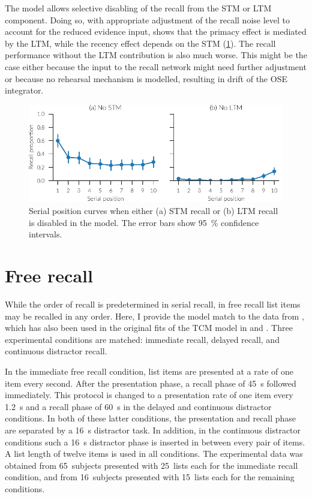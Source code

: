 The model allows selective disabling of the recall from the STM or LTM component.
Doing so, with appropriate adjustment of the recall noise level to account for the reduced evidence input, shows that the primacy effect is mediated by the LTM, while the recency effect depends on the STM (\cref{fig:results-no_xtm}).
The recall performance without the LTM contribution is also much worse.
This might be the case either because the input to the recall network might need further adjustment or because no rehearsal mechanism is modelled, resulting in drift of the OSE integrator.
\begin{figure}
    \centering
    \includegraphics{figures/results/no_xtm}
    \caption[Serial position curves with disabled STM/LTM.]{Serial position curves when either (a) STM recall or (b) LTM recall is disabled in the model. The error bars show \SI{95}{\percent} confidence intervals.}\label{fig:results-no_xtm}
\end{figure}


\section{Free recall}
While the order of recall is predetermined in serial recall, in free recall list items may be recalled in any order.
Here, I provide the model match to the data from \textcite{Howard1999}, which has also been used in the original fits of the TCM model in \textcite{Howard2002} and \textcite{Sederberg2008}.
Three experimental conditions are matched: immediate recall, delayed recall, and continuous distractor recall.

In the immediate free recall condition, list items are presented at a rate of one item every second.
After the presentation phase, a recall phase of \SI{45}{\second} followed immediately.
This protocol is changed to a presentation rate of one item every \SI{1.2}{\second} and a recall phase of \SI{60}{\second} in the delayed and continuous distractor conditions.
In both of these latter conditions, the presentation and recall phase are separated by a \SI{16}{\second} distractor task.
In addition, in the continuous distractor conditions such a \SI{16}{\second} distractor phase is inserted in between every pair of items.
A list length of twelve items is used in all conditions.
The experimental data was obtained from \num{65}~subjects presented with \num{25}~lists each for the immediate recall condition, and from \num{16}~subjects presented with \num{15}~lists each for the remaining conditions.

